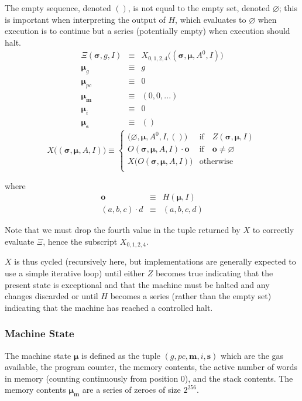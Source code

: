 \documentclass[9pt,oneside]{amsart}
\begin{document}
\begin{multicols}{2}
The empty sequence, denoted $()$, is not equal to the empty set, denoted $\varnothing$; this is important when interpreting the output of $H$, which evaluates to $\varnothing$ when execution is to continue but a series (potentially empty) when execution should halt.
\begin{eqnarray}
\Xi(\boldsymbol{\sigma}, g, I) & \equiv & X_{0,1,2,4}\big((\boldsymbol{\sigma}, \boldsymbol{\mu}, A^0, I)\big) \\
\boldsymbol{\mu}_g & \equiv & g \\
\boldsymbol{\mu}_{pc} & \equiv & 0 \\
\boldsymbol{\mu}_\mathbf{m} & \equiv & (0, 0, ...) \\
\boldsymbol{\mu}_i & \equiv & 0 \\
\boldsymbol{\mu}_\mathbf{s} & \equiv & ()
\end{eqnarray}
\begin{equation}
X\big( (\boldsymbol{\sigma}, \boldsymbol{\mu}, A, I) \big) \equiv \begin{cases}
\big(\varnothing, \boldsymbol{\mu}, A^0, I, ()\big) & \text{if} \quad Z(\boldsymbol{\sigma}, \boldsymbol{\mu}, I)\\
O(\boldsymbol{\sigma}, \boldsymbol{\mu}, A, I) \cdot \mathbf{o} & \text{if} \quad \mathbf{o} \neq \varnothing\\
X\big(O(\boldsymbol{\sigma}, \boldsymbol{\mu}, A, I)\big) & \text{otherwise}\\
\end{cases}
\end{equation}

where
\begin{eqnarray}
\mathbf{o} & \equiv & H(\boldsymbol{\mu}, I) \\
(a, b, c) \cdot d & \equiv & (a, b, c, d)
\end{eqnarray}

Note that we must drop the fourth value in the tuple returned by $X$ to correctly evaluate $\Xi$, hence the subscript $X_{0,1,2,4}$.

$X$ is thus cycled (recursively here, but implementations are generally expected to use a simple iterative loop) until either $Z$ becomes true indicating that the present state is exceptional and that the machine must be halted and any changes discarded or until $H$ becomes a series (rather than the empty set) indicating that the machine has reached a controlled halt.

\subsubsection{Machine State}
The machine state $\boldsymbol{\mu}$ is defined as the tuple $(g, pc, \mathbf{m}, i, \mathbf{s})$ which are the gas available, the program counter, the memory contents, the active number of words in memory (counting continuously from position 0), and the stack contents. The memory contents $\boldsymbol{\mu}_\mathbf{m}$ are a series of zeroes of size $2^{256}$.


\end{multicols}
\end{document}
